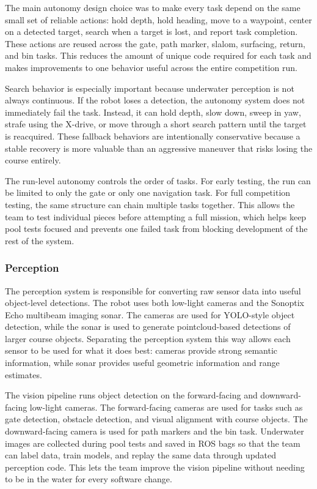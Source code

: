 \documentclass[conference]{IEEEtran}
\begin{document}
The main autonomy design choice was to make every task depend on the same small set of reliable actions: hold depth, hold heading, move to a waypoint, center on a detected target, search when a target is lost, and report task completion. These actions are reused across the gate, path marker, slalom, surfacing, return, and bin tasks. This reduces the amount of unique code required for each task and makes improvements to one behavior useful across the entire competition run.

Search behavior is especially important because underwater perception is not always continuous. If the robot loses a detection, the autonomy system does not immediately fail the task. Instead, it can hold depth, slow down, sweep in yaw, strafe using the X-drive, or move through a short search pattern until the target is reacquired. These fallback behaviors are intentionally conservative because a stable recovery is more valuable than an aggressive maneuver that risks losing the course entirely.

The run-level autonomy controls the order of tasks. For early testing, the run can be limited to only the gate or only one navigation task. For full competition testing, the same structure can chain multiple tasks together. This allows the team to test individual pieces before attempting a full mission, which helps keep pool tests focused and prevents one failed task from blocking development of the rest of the system.


\subsubsection{Perception}
The perception system is responsible for converting raw sensor data into useful object-level detections. The robot uses both low-light cameras and the Sonoptix Echo multibeam imaging sonar. The cameras are used for YOLO-style object detection, while the sonar is used to generate pointcloud-based detections of larger course objects. Separating the perception system this way allows each sensor to be used for what it does best: cameras provide strong semantic information, while sonar provides useful geometric information and range estimates.

The vision pipeline runs object detection on the forward-facing and downward-facing low-light cameras. The forward-facing cameras are used for tasks such as gate detection, obstacle detection, and visual alignment with course objects. The downward-facing camera is used for path markers and the bin task. Underwater images are collected during pool tests and saved in ROS bags so that the team can label data, train models, and replay the same data through updated perception code. This lets the team improve the vision pipeline without needing to be in the water for every software change.
\end{document}
